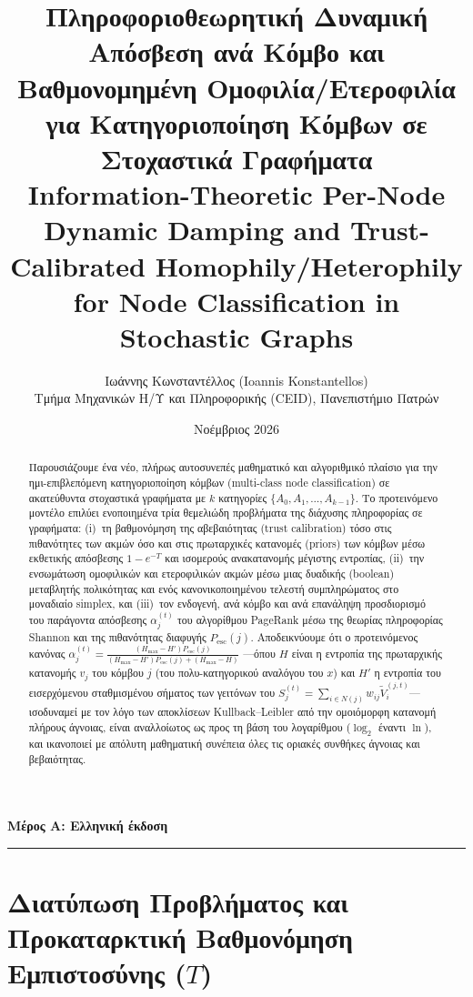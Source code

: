 \documentclass[11pt, a4paper]{article}
\title{\textbf{Πληροφοριοθεωρητική Δυναμική Απόσβεση ανά Κόμβο και Βαθμονομημένη Ομοφιλία/Ετεροφιλία για Κατηγοριοποίηση Κόμβων σε Στοχαστικά Γραφήματα}\\[8pt]
\large Information-Theoretic Per-Node Dynamic Damping and Trust-Calibrated Homophily/Heterophily for Node Classification in Stochastic Graphs}
\author{Ιωάννης Κωνσταντέλλος (Ioannis Konstantellos)\\
\small Τμήμα Μηχανικών Η/Υ και Πληροφορικής (CEID), Πανεπιστήμιο Πατρών}
\date{Νοέμβριος 2026}
\theoremstyle{definition}
\theoremstyle{definition}
\begin{document}
\maketitle

\begin{center}
\Large \textbf{Μέρος Α: Ελληνική έκδοση}
\end{center}
\vspace{4pt}
\hrule
\vspace{8pt}

\begin{abstract}
\noindent Παρουσιάζουμε ένα νέο, πλήρως αυτοσυνεπές μαθηματικό και αλγοριθμικό πλαίσιο για την ημι-επιβλεπόμενη κατηγοριοποίηση κόμβων (multi-class node classification) σε ακατεύθυντα στοχαστικά γραφήματα με $k$ κατηγορίες $\{A_0, A_1, \dots, A_{k-1}\}$. Το προτεινόμενο μοντέλο επιλύει ενοποιημένα τρία θεμελιώδη προβλήματα της διάχυσης πληροφορίας σε γραφήματα: (i)~τη βαθμονόμηση της αβεβαιότητας (trust calibration) τόσο στις πιθανότητες των ακμών όσο και στις πρωταρχικές κατανομές (priors) των κόμβων μέσω εκθετικής απόσβεσης $1 - e^{-T}$ και ισομερούς ανακατανομής μέγιστης εντροπίας, (ii)~την ενσωμάτωση ομοφιλικών και ετεροφιλικών ακμών μέσω μιας δυαδικής (boolean) μεταβλητής πολικότητας και ενός κανονικοποιημένου τελεστή συμπληρώματος στο μοναδιαίο simplex, και (iii)~τον ενδογενή, ανά κόμβο και ανά επανάληψη προσδιορισμό του παράγοντα απόσβεσης $\alpha_j^{(t)}$ του αλγορίθμου PageRank μέσω της θεωρίας πληροφορίας Shannon και της πιθανότητας διαφυγής $P_{\mathrm{esc}}(j)$. Αποδεικνύουμε ότι ο προτεινόμενος κανόνας $\alpha_j^{(t)} = \frac{(H_{\max} - H')P_{\mathrm{esc}}(j)}{(H_{\max} - H')P_{\mathrm{esc}}(j) + (H_{\max} - H)}$ —όπου $H$ είναι η εντροπία της πρωταρχικής κατανομής $v_j$ του κόμβου $j$ (του πολυ-κατηγορικού αναλόγου του $x$) και $H'$ η εντροπία του εισερχόμενου σταθμισμένου σήματος των γειτόνων του $S_j^{(t)} = \sum_{i \in N(j)} w_{ij}\tilde{V}_i^{(j,t)}$— ισοδυναμεί με τον λόγο των αποκλίσεων Kullback--Leibler από την ομοιόμορφη κατανομή πλήρους άγνοιας, είναι αναλλοίωτος ως προς τη βάση του λογαρίθμου ($\log_2$ έναντι $\ln$), και ικανοποιεί με απόλυτη μαθηματική συνέπεια όλες τις οριακές συνθήκες άγνοιας και βεβαιότητας.
\end{abstract}

\section{Διατύπωση Προβλήματος και Προκαταρκτική Βαθμονόμηση Εμπιστοσύνης (\texorpdfstring{$T$}{T})}
\end{document}
